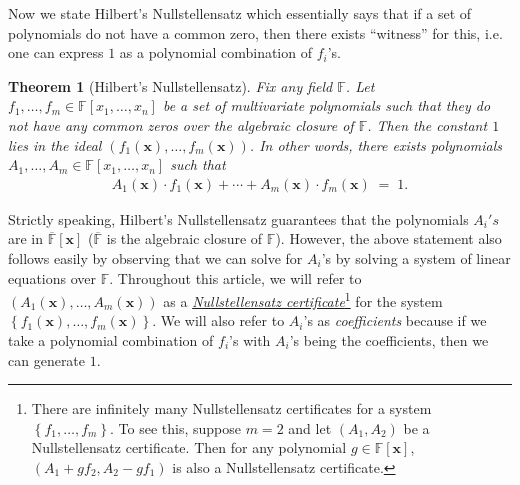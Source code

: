\documentclass[11pt]{article}
\newtheorem{theorem}{Theorem}[section]
\newcommand{\set}[1]{\left\{ #1 \right\}}
\newcommand{\F}{\mathbb{F}}
\begin{document}
\noindent
Now we state Hilbert's Nullstellensatz which essentially says that if a set of polynomials do not have a common zero, then there exists ``witness'' for this, i.e. one can express $1$ as a polynomial combination of $f_{i}$'s.\\

\begin{theorem}[Hilbert's Nullstellensatz]\label{thm:nullstellensatz}
Fix any field $\F$. Let $f_{1}, \ldots, f_{m} \in \F[x_{1},\ldots,x_{n}]$ be a set of multivariate polynomials such that they do not have any common zeros over the algebraic closure of $\F$. Then the constant $1$ lies in the ideal $(f_{1}(\mathbf{x}), \ldots, f_{m}(\mathbf{x}))$. In other words, there exists polynomials $A_{1},\ldots,A_{m} \in \F[x_{1},\ldots,x_{n}]$ such that
\begin{align*}
    A_{1}(\mathbf{x}) \cdot f_{1}(\mathbf{x}) + \cdots + A_{m}(\mathbf{x}) \cdot f_{m}(\mathbf{x}) \; = \; 1.
\end{align*}
\end{theorem}

\noindent
Strictly speaking, Hilbert's Nullstellensatz guarantees that the polynomials $A_{i}'s$ are in $\overline{\F}[\mathbf{x}]$ ($\overline{\F}$ is the algebraic closure of $\F$). However, the above statement also follows easily by observing that we can solve for $A_{i}$'s by solving a system of linear equations over $\F$. Throughout this article, we will refer to $(A_{1}(\mathbf{x}), \ldots, A_{m}(\mathbf{x}))$ as a \underline{\emph{Nullstellensatz certificate}}\footnote{There are infinitely many Nullstellensatz certificates for a system $\set{f_{1},\ldots,f_{m}}$. To see this, suppose $m = 2$ and let $(A_{1},A_{2})$ be a Nullstellensatz certificate. Then for any polynomial $g \in \F[\mathbf{x}]$, $(A_{1} + gf_{2}, A_{2} - gf_{1})$ is also a Nullstellensatz certificate.} for the system $\set{f_{1}(\mathbf{x}), \ldots, f_{m}(\mathbf{x})}$. We will also refer to $A_{i}$'s as \emph{coefficients} because if we take a polynomial combination of $f_{i}$'s with $A_{i}$'s being the coefficients, then we can generate $1$.
\end{document}
